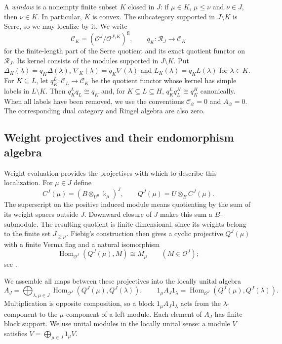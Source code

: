 \documentclass[11pt,reqno]{amsart}
\newcommand{\kk}{\Bbbk}\newcommand{\ZZ}{\mathbb Z}\newcommand{\NN}{\mathbb N}
\newcommand{\OO}{\mathcal O}\newcommand{\CC}{\mathscr C}\newcommand{\RR}{\mathcal R}\newcommand{\DD}{\mathcal D}
\newcommand{\Hom}{\operatorname{Hom}}\newcommand{\End}{\operatorname{End}}\newcommand{\Ext}{\operatorname{Ext}}
\newcommand{\fl}{\mathrm{fl}}\newcommand{\pf}{\mathrm{pf}}\newcommand{\op}{\mathrm{op}}\newcommand{\wt}{\mathrm{wt}}
\theoremstyle{definition}
\theoremstyle{remark}
\numberwithin{equation}{section}
\begin{document}
A \emph{window} is a nonempty finite subset $K$ closed in $J$: if
$\mu\in K$, $\mu\leq\nu$ and $\nu\in J$, then $\nu\in K$.
In particular, $K$ is convex. The subcategory supported in
$J\setminus K$ is Serre, so we may localize by it. We write
\begin{equation}\label{eq:window-category}
 \CC_K=(\OO^J/\OO^{J\setminus K})^{\fl},\qquad
 q_K:\RR_J\longrightarrow\CC_K
\end{equation}
for the finite-length part of the Serre quotient and its exact quotient
functor on $\RR_J$. Its kernel consists of the modules supported in
$J\setminus K$. Put
$\Delta_K(\lambda)=q_K\Delta(\lambda)$,
$\nabla_K(\lambda)=q_K\nabla(\lambda)$ and
$L_K(\lambda)=q_KL(\lambda)$ for $\lambda\in K$.
For $K\subseteq L$, let $q_K^L:\CC_L\to\CC_K$ be the quotient
functor whose kernel has simple labels in $L\setminus K$.
Then $q_K^Lq_L\cong q_K$ and, for $K\subseteq L\subseteq H$,
$q_K^Lq_L^H\cong q_K^H$ canonically.
When all labels have been removed, we use the conventions
$\CC_\varnothing=0$ and $A_\varnothing=0$. The corresponding
dual category and Ringel algebra are also zero.

\subsection{Weight projectives and their endomorphism algebra}
Weight evaluation provides the projectives with which to describe
this localization. For $\mu\in J$ define
\[
 C^J(\mu)=(B\otimes_{U^0}\kk_\mu)^J,\qquad
 Q^J(\mu)=U\otimes_B C^J(\mu).
\]
The superscript on the positive induced module means quotienting by
the sum of its weight spaces outside $J$. Downward closure of $J$
makes this sum a $B$-submodule. The resulting quotient is finite
dimensional, since its weights belong to the finite set
$J_{\geq\mu}$. Fiebig's construction then gives a cyclic projective
$Q^J(\mu)$ with a finite Verma flag and a natural isomorphism
\begin{equation}\label{eq:weight-representer}
 \Hom_{\OO^J}(Q^J(\mu),M)\cong M_\mu
 \qquad(M\in\OO^J);
\end{equation}
see \cite[Theorem~17 and its proof]{Fiebig}.

We assemble all maps between these projectives into the locally
unital algebra
\begin{equation}\label{eq:raw-global}
 A_J=\bigoplus_{\lambda,\mu\in J}
 \Hom_{\OO^J}(Q^J(\mu),Q^J(\lambda)),\qquad
 1_\mu A_J1_\lambda=
 \Hom_{\OO^J}(Q^J(\mu),Q^J(\lambda)).
\end{equation}
Multiplication is opposite composition, so a block
$1_\mu A_J1_\lambda$ acts from the $\lambda$-component to the
$\mu$-component of a left module. Each element of $A_J$ has finite
block support. We use unital modules in the locally unital sense:
a module $V$ satisfies $V=\bigoplus_{\mu\in J}1_\mu V$.
\end{document}
